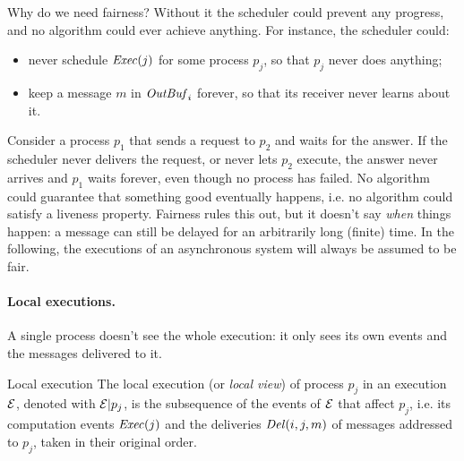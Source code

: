 Why do we need fairness? Without it the scheduler could prevent any progress, and no algorithm could ever achieve anything. For instance, the scheduler could:
\begin{itemize}
  \item never schedule $\mathit{Exec}(j)$ for some process $p_j$, so that $p_j$ never does anything;
  \item keep a message $m$ in $\mathit{OutBuf}_i$ forever, so that its receiver never learns about it.
\end{itemize}
Consider a process $p_1$ that sends a request to $p_2$ and waits for the answer. If the scheduler never delivers the request, or never lets $p_2$ execute, the answer never arrives and $p_1$ waits forever, even though no process has failed. No algorithm could guarantee that something good eventually happens, i.e. no algorithm could satisfy a liveness property. Fairness rules this out, but it doesn't say \textit{when} things happen: a message can still be delayed for an arbitrarily long (finite) time. In the following, the executions of an asynchronous system will always be assumed to be fair.

\paragraph{Local executions.} A single process doesn't see the whole execution: it only sees its own events and the messages delivered to it.

\begin{frameddefn}{Local execution}
  The local execution (or \textit{local view}) of process $p_j$ in an execution $\mathcal{E}$, denoted with $\mathcal{E}|p_j$, is the subsequence of the events of $\mathcal{E}$ that affect $p_j$, i.e. its computation events $\mathit{Exec}(j)$ and the deliveries $\mathit{Del}(i,j,m)$ of messages addressed to $p_j$, taken in their original order.
\end{frameddefn}

